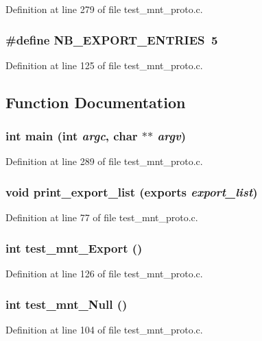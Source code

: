 Definition at line 279 of file test\_\-mnt\_\-proto.c.
\subsubsection[{NB\_\-EXPORT\_\-ENTRIES}]{\setlength{\rightskip}{0pt plus 5cm}\#define NB\_\-EXPORT\_\-ENTRIES~5}\label{test__mnt__proto_8c_a2fe5c50405023da952d76450ca5c8b74}


Definition at line 125 of file test\_\-mnt\_\-proto.c.

\subsection{Function Documentation}
\subsubsection[{main}]{\setlength{\rightskip}{0pt plus 5cm}int main (int {\em argc}, \/  char $\ast$$\ast$ {\em argv})}\label{test__mnt__proto_8c_a3c04138a5bfe5d72780bb7e82a18e627}


Definition at line 289 of file test\_\-mnt\_\-proto.c.
\subsubsection[{print\_\-export\_\-list}]{\setlength{\rightskip}{0pt plus 5cm}void print\_\-export\_\-list (exports {\em export\_\-list})}\label{test__mnt__proto_8c_a57ab96e36873b8bb9c2029f0cabeec7e}


Definition at line 77 of file test\_\-mnt\_\-proto.c.
\subsubsection[{test\_\-mnt\_\-Export}]{\setlength{\rightskip}{0pt plus 5cm}int test\_\-mnt\_\-Export ()}\label{test__mnt__proto_8c_acc06b966584ff390efa22aa422aa21a0}


Definition at line 126 of file test\_\-mnt\_\-proto.c.
\subsubsection[{test\_\-mnt\_\-Null}]{\setlength{\rightskip}{0pt plus 5cm}int test\_\-mnt\_\-Null ()}\label{test__mnt__proto_8c_a3a63791505a7b76d63380f9daa870c15}


Definition at line 104 of file test\_\-mnt\_\-proto.c.